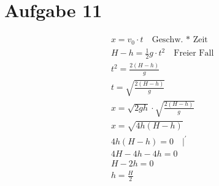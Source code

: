 \documentclass[a4paper, ngerman]{scrartcl}
\begin{document}
	\section*{Aufgabe 11}
	
	\begin{align*}
		&x=v_0\cdot t \quad \text{Geschw. * Zeit}\\
		&H-h = \frac{1}{2}g\cdot t^2 \quad \text{Freier Fall}\\
		&t^2 = \frac{2(H-h)}{g}\\
		&t = \sqrt{\frac{2(H-h)}{g}}\\
		&x = \sqrt{2gh}\cdot \sqrt{\frac{2(H-h)}{g}}\\
		&x = \sqrt{4h(H-h)} \\
		&4h(H-h) = 0 \quad \vert ^\prime\\
		&4H-4h-4h = 0\\
		&H-2h = 0\\
		&h = \frac{H}{2}\\
	\end{align*}
	
	
\end{document}
